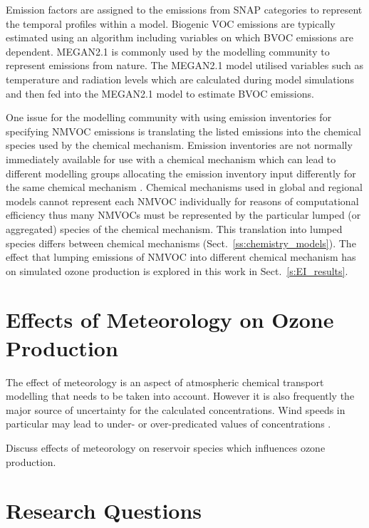 Emission factors are assigned to the emissions from SNAP categories to represent the temporal profiles within a model.
Biogenic VOC emissions are typically estimated using an algorithm including variables on which BVOC emissions are dependent.
MEGAN2.1 \citep{Guenther:2012} is commonly used by the modelling community to represent emissions from nature.
The MEGAN2.1 model utilised variables such as temperature and radiation levels which are calculated during model simulations and then fed into the MEGAN2.1 model to estimate BVOC emissions.

One issue for the modelling community with using emission inventories for specifying NMVOC emissions is translating the listed emissions into the chemical species used by the chemical mechanism.
Emission inventories are not normally immediately available for use with a chemical mechanism which can lead to different modelling groups allocating the emission inventory input differently for the same chemical mechanism \citep{Carter:2015}.
Chemical mechanisms used in global and regional models cannot represent each NMVOC individually for reasons of computational efficiency thus many NMVOCs must be represented by the particular lumped (or aggregated) species of the chemical mechanism.
This translation into lumped species differs between chemical mechanisms (Sect.~\ref{ss:chemistry_models}).
The effect that lumping emissions of NMVOC into different chemical mechanism has on simulated ozone production is explored in this work in Sect.~\ref{s:EI_results}.

\section{Effects of Meteorology on Ozone Production} \label{s:meteo_ozone}

The effect of meteorology is an aspect of atmospheric chemical transport modelling that needs to be taken into account. 
However it is also frequently the major source of uncertainty for the calculated  concentrations. 
Wind speeds in particular may lead to under- or over-predicated values of  concentrations \citep{Sillman:1999}. 

Discuss effects of meteorology on reservoir species which influences ozone production.

\section{Research Questions} \label{s:research_questions}

